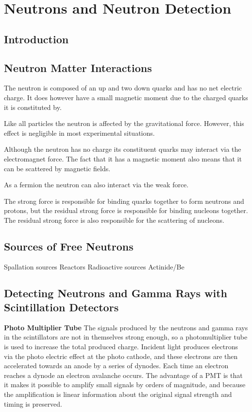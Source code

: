 \documentclass[main.tex]{subfiles}
\begin{document}
\section{Neutrons and Neutron Detection}
\subsection{Introduction}

\subsection{Neutron Matter Interactions}
The neutron is composed of an up and two down quarks and has no net electric charge. It does however have a small magnetic moment due to the charged quarks it is constituted by. 

Like all particles the neutron is affected by the gravitational force. However, this effect is negligible in most experimental situations.

Although the neutron has no charge its constituent quarks may interact via the electromagnet force. The fact that it has a magnetic moment also means that it can be scattered by magnetic fields.

As a fermion the neutron can also interact via the weak force.

The strong force is responsible for binding quarks together to form neutrons and protons, but the residual strong force is responsible for binding nucleons together. The residual strong force is also responsible for the scattering of nucleons.



\subsection{Sources of Free Neutrons}
Spallation sources
Reactors
Radioactive sources
Actinide/Be

\subsection{Detecting Neutrons and Gamma Rays with Scintillation Detectors}
\textbf{Photo Multiplier Tube}\newline
The signals produced by the neutrons and gamma rays in the scintillators are not in themselves strong enough, so a photomultiplier tube is used to increase the total produced charge. Incident light produces electrons via the photo electric effect at the photo cathode, and these electrons are then accelerated towards an anode by a series of dynodes. Each time an electron reaches a dynode an electron avalanche occurs. The advantage of a PMT is that it makes it possible to amplify small signals by orders of magnitude, and because the amplification is linear information about the original signal strength and timing is preserved.
\end{document}
